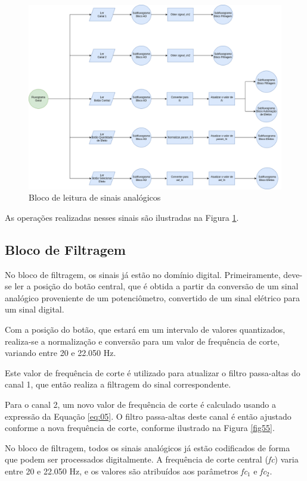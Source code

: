 \begin{figure}[h]
    \centering
    \includegraphics[width=\textwidth]{figuras/fig54.png}
    \caption{Bloco de leitura de sinais analógicos}
    \label{fig54}
\end{figure}

As operações realizadas nesses sinais são ilustradas na Figura \ref{fig54}.

\subsection{Bloco de Filtragem}

No bloco de filtragem, os sinais já estão no domínio digital. Primeiramente, deve-se ler a posição do botão central, que é obtida a partir da conversão de um sinal analógico proveniente de um potenciômetro, convertido de um sinal elétrico para um sinal digital.

Com a posição do botão, que estará em um intervalo de valores quantizados, realiza-se a normalização e conversão para um valor de frequência de corte, variando entre 20 e 22.050 Hz.

Este valor de frequência de corte é utilizado para atualizar o filtro passa-altas do canal 1, que então realiza a filtragem do sinal correspondente.

Para o canal 2, um novo valor de frequência de corte é calculado usando a expressão da Equação \ref{eq:05}. O filtro passa-altas deste canal é então ajustado conforme a nova frequência de corte, conforme ilustrado na Figura \ref{fig55}.

No bloco de filtragem, todos os sinais analógicos já estão codificados de forma que podem ser processados digitalmente. A frequência de corte central (\textit{fc}) varia entre 20 e 22.050 Hz, e os valores são atribuídos aos parâmetros \textit{fc$_{1}$} e \textit{fc$_{2}$}.

